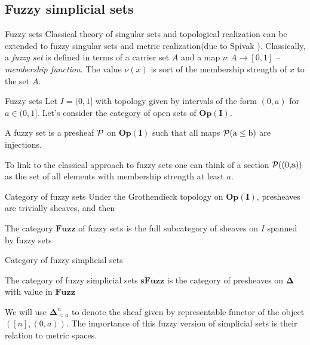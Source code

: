 \documentclass{beamer}
\theoremstyle{named}
\begin{document}
\subsection{Fuzzy simplicial sets}

\begin{frame}{Fuzzy sets}
	Classical theory of singular sets and topological realization can be extended to fuzzy singular sets and metric realization(due to Spivak \cite{spivak}).
	\newline
	\newline
	Classically, a {\it fuzzy set} is defined in terms of a carrier set $A$ and a map $\nu: A \to [0,1]$ -- {\it membership function}. The value $\nu(x)$ is sort of the membership strength of $x$ to the set $A$.
\end{frame}

\begin{frame}{Fuzzy sets}
	Let $I = (0,1]$ with topology given by intervals of the form $(0,a)$ for $a \in (0,1]$. Let's consider the category of open sets of $\pmb{Op(I)}$.
	
	\begin{definition}
		A fuzzy set is a presheaf $\cal{P}$ on $\pmb{Op(I)}$ such that all maps $\cal{P}(\text{a} \leq \text{b})$ are injections.
	\end{definition}
	
	To link to the classical approach to fuzzy sets one can think of a section $\cal{P}((\text{0,a}))$ as the set of all elements with membership strength at least $a$.
\end{frame}

\begin{frame}{Category of fuzzy sets}
	Under the Grothendieck topology on $\pmb{Op(I)}$, presheaves are trivially sheaves, and then
	\begin{definition}
		The category $\pmb{Fuzz}$ of fuzzy sets is the full subcategory of sheaves on $I$ spanned by fuzzy sets
	\end{definition}
\end{frame}

\begin{frame}{Category of fuzzy simplicial sets}
	\begin{definition}
		The category of fuzzy simplicial sets $\pmb{sFuzz}$ is the category of presheaves on $\pmb{\Delta}$ with value in $\pmb{Fuzz}$
	\end{definition}
	We will use $\mathbf{\Delta}^n_{<a}$ to denote the sheaf given by representable functor of the object $([n], (0,a))$. The importance of this fuzzy version of simplicial sets is their relation to metric spaces.
\end{frame}
\end{document}
